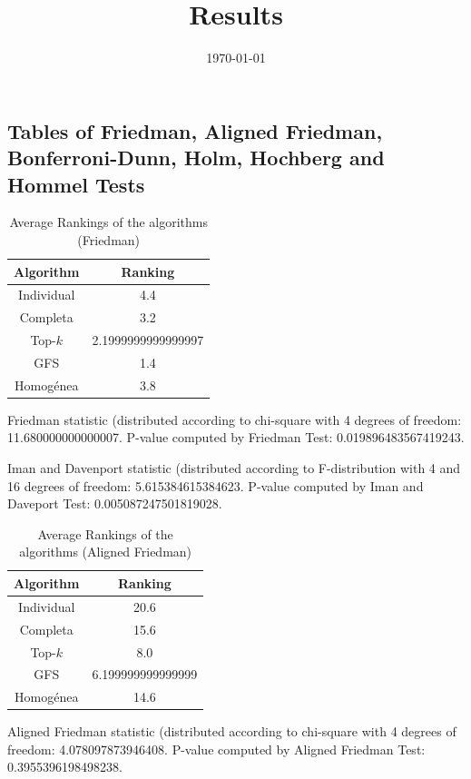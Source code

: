 \documentclass[a4paper,10pt]{article}
\title{Results}
\author{}
\date{\today}
\begin{document}
\begin{landscape}
\oddsidemargin 0in \topmargin 0in\maketitle
\section{Tables of Friedman, Aligned Friedman, Bonferroni-Dunn, Holm, Hochberg and Hommel Tests}
\begin{table}[!htp]
\centering
\caption{Average Rankings of the algorithms (Friedman)
}\begin{tabular}{c|c}
Algorithm&Ranking\\
\hline
Individual&4.4\\
Completa&3.2\\
Top-$k$&2.1999999999999997\\
GFS&1.4\\
Homogénea&3.8\\
\end{tabular}
\end{table}


Friedman statistic (distributed according to chi-square with 4 degrees of freedom: 11.680000000000007. 
P-value computed by Friedman Test: 0.019896483567419243.\newline

Iman and Davenport statistic (distributed according to F-distribution with 4 and 16 degrees of freedom: 5.615384615384623. 
P-value computed by Iman and Daveport Test: 0.005087247501819028.\newline


\newpage

\begin{table}[!htp]
\centering
\caption{Average Rankings of the algorithms (Aligned Friedman)
}\begin{tabular}{c|c}
Algorithm&Ranking\\
\hline
Individual&20.6\\
Completa&15.6\\
Top-$k$&8.0\\
GFS&6.199999999999999\\
Homogénea&14.6\\
\end{tabular}
\end{table}


Aligned Friedman statistic (distributed according to chi-square with 4 degrees of freedom: 4.078097873946408. 
P-value computed by Aligned Friedman Test: 0.3955396198498238.\newline



\end{landscape}
\end{document}
